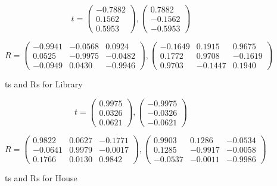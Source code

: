 \documentclass[11pt]{article}
\begin{document}
\begin{figure}[h!]
  \caption{ts and Rs for Library}
  \label{tr_library}
  \centering
    \[t = \begin{pmatrix}
      -0.7882\\
      0.1562\\
      0.5953
    \end{pmatrix}, 
    \begin{pmatrix}
      0.7882\\
      -0.1562\\
      -0.5953
    \end{pmatrix}\]

    \[R = \begin{pmatrix}
      -0.9941&-0.0568&0.0924\\
       0.0525&-0.9975&-0.0482\\
      -0.0949& 0.0430&-0.9946
    \end{pmatrix},
    \begin{pmatrix}
      -0.1649&0.1915&0.9675\\
      0.1772& 0.9708&-0.1619\\
      0.9703&-0.1447&0.1940
    \end{pmatrix}\]
\end{figure}

\begin{figure}[h!]
  \caption{ts and Rs for House}
  \label{tr_house}
  \centering
    \[t = \begin{pmatrix}
      0.9975\\
      0.0326\\
      0.0621
    \end{pmatrix}, 
    \begin{pmatrix}
      -0.9975\\
      -0.0326\\
      -0.0621
    \end{pmatrix}\]

    \[R = \begin{pmatrix}
      0.9822&0.0627&-0.1771\\
     -0.0641&0.9979&-0.0017\\
      0.1766&0.0130&0.9842
    \end{pmatrix},
    \begin{pmatrix}
      0.9903&0.1286&-0.0534\\
      0.1285&-0.9917&-0.0058\\
      -0.0537&-0.0011&-0.9986
    \end{pmatrix}\]
\end{figure}
\end{document}
